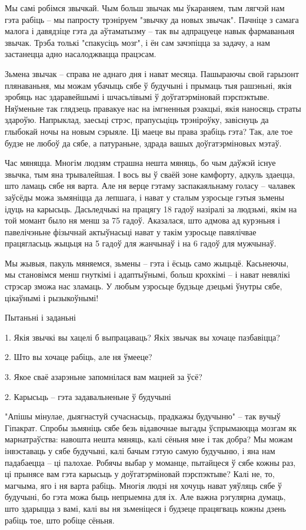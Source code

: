 Мы самі робімся звычкай. Чым больш звычак мы ўкараняем, тым лягчэй нам гэта рабіць – мы папросту трэніруем "звычку да новых звычак". Пачніце з самага малога і давядзіце гэта да аўтаматызму – так вы адпрацуеце навык фармаваньня звычак. Трэба толькі "спакусіць мозг", і ён сам зачэпіцца за задачу, а нам застанецца адно насалоджвацца працэсам.

Зьмена звычак – справа не аднаго дня і нават месяца. Пашыраючы свой гарызонт плянаваньня, мы можам убачыць сябе ў будучыні і прымаць тыя рашэньні, якія зробяць нас здаравейшымі і шчасьлівымі ў доўгатэрміновай пэрспэктыве. Няўменьне так глядзець правакуе нас на імгненныя рэакцыі, якія наносяць страты здароўю. Напрыклад, заесьці стрэс, прапусьціць трэніроўку, завіснуць да глыбокай ночы на новым сэрыяле. Ці маеце вы права зрабіць гэта? Так, але тое будзе не любоў да сябе, а патураньне, здрада вашых доўгатэрміновых мэтаў.

Час мяняцца. Многім людзям страшна нешта мяняць, бо чым даўжэй існуе звычка, тым яна трывалейшая. І вось вы ў сваёй зоне камфорту, адкуль здаецца, што ламаць сябе ня варта. Але ня верце гэтаму заспакаяльнаму голасу – чалавек заўсёды можа зьмяніцца да лепшага, і нават у сталым узросьце гэтыя зьмены ідуць на карысьць. Дасьледчыкі на працягу 18 гадоў назіралі за людзьмі, якім на той момант было ня менш за 75 гадоў. Аказалася, што адмова ад курэньня і павелічэньне фізычнай актыўнасьці нават у такім узросьце павялічвае працягласьць жыцьця на 5 гадоў для жанчынаў і на 6 гадоў для мужчынаў.

Мы жывыя, пакуль мяняемся, зьмены – гэта і ёсьць само жыцьцё. Касьнеючы, мы становімся менш гнуткімі і адаптыўнымі, больш крохкімі – і нават невялікі стрэсар зможа нас зламаць. У любым узросьце будзьце дзецьмі ўнутры сябе, цікаўнымі і рызыкоўнымі!

Пытаньні і заданьні

1. Якія звычкі вы хацелі б выпрацаваць? Якіх звычак вы хочаце пазбавіцца?

2. Што вы хочаце рабіць, але ня ўмееце?

3. Якое сваё азарэньне запомнілася вам мацней за ўсё?


2. Карысьць – гэта задавальненьне ў будучыні

"Апішы мінулае, дыягнастуй сучаснасьць, прадкажы будучыню" – так вучыў Гіпакрат. Спробы зьмяніць сябе безь відавочнае выгады ўспрымаюцца мозгам як марнатраўства: навошта нешта мяняць, калі сёньня мне і так добра? Мы можам інвэставаць у сябе будучыні, калі бачым гэтую самую будучыню, і яна нам падабаецца – ці палохае. Робячы выбар у моманце, пытайцеся ў сябе кожны раз, ці прынясе вам гэта карысьць у доўгатэрміновай пэрспэктыве? Калі не, то, магчыма, яго і ня варта рабіць. Многія людзі ня хочуць нават уяўляць сябе ў будучыні, бо гэта можа быць непрыемна для іх. Але важна рэгулярна думаць, што здарыцца з вамі, калі вы ня зьменіцеся і будзеце працягваць кожны дзень рабіць тое, што робіце сёньня.

